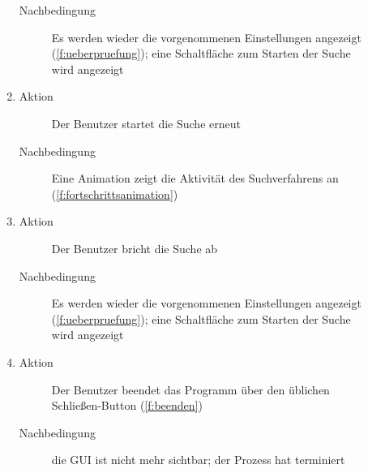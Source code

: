 \begin{description}
\begin{enumerate}
\begin{description}
			\item[Nachbedingung] Es werden wieder die vorgenommenen Einstellungen angezeigt (\ref{f:ueberpruefung}); eine Schaltfläche zum Starten der Suche wird angezeigt
		\end{description}
		\item
		\begin{description}
			\item[Aktion] Der Benutzer startet die Suche erneut
			\item[Nachbedingung] Eine Animation zeigt die Aktivität des Suchverfahrens an (\ref{f:fortschrittsanimation})
		\end{description}
		\item
		\begin{description}
			\item[Aktion] Der Benutzer bricht die Suche ab
			\item[Nachbedingung] Es werden wieder die vorgenommenen Einstellungen angezeigt (\ref{f:ueberpruefung}); eine Schaltfläche zum Starten der Suche wird angezeigt
		\end{description}
		\item
		\begin{description}
			\item[Aktion] Der Benutzer beendet das Programm über den üblichen Schließen-Button (\ref{f:beenden})
			\item[Nachbedingung] die GUI ist nicht mehr sichtbar; der Prozess hat terminiert
		\end{description}
	\end{enumerate}


\end{description}
